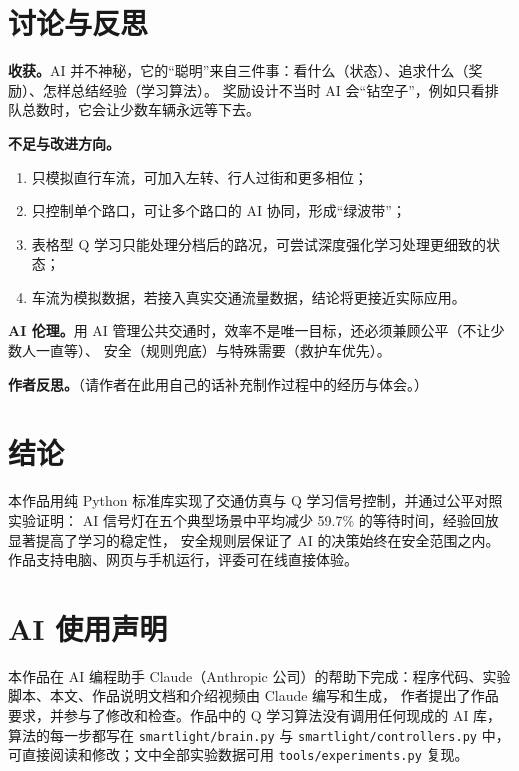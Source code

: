 \documentclass[UTF8,a4paper,zihao=-4,fontset=none]{ctexart}
\begin{document}
\section{讨论与反思}

\textbf{收获。}AI 并不神秘，它的“聪明”来自三件事：看什么（状态）、追求什么（奖励）、怎样总结经验（学习算法）。
奖励设计不当时 AI 会“钻空子”，例如只看排队总数时，它会让少数车辆永远等下去。

\textbf{不足与改进方向。}
\begin{enumerate}
  \item 只模拟直行车流，可加入左转、行人过街和更多相位；
  \item 只控制单个路口，可让多个路口的 AI 协同，形成“绿波带”；
  \item 表格型 Q 学习只能处理分档后的路况，可尝试深度强化学习\cite{mnih2015}处理更细致的状态；
  \item 车流为模拟数据，若接入真实交通流量数据，结论将更接近实际应用。
\end{enumerate}

\textbf{AI 伦理。}用 AI 管理公共交通时，效率不是唯一目标，还必须兼顾公平（不让少数人一直等）、
安全（规则兜底）与特殊需要（救护车优先）。

\textbf{作者反思。}（请作者在此用自己的话补充制作过程中的经历与体会。）

\section{结论}
本作品用纯 Python 标准库实现了交通仿真与 Q 学习信号控制，并通过公平对照实验证明：
AI 信号灯在五个典型场景中平均减少 59.7\% 的等待时间，经验回放显著提高了学习的稳定性，
安全规则层保证了 AI 的决策始终在安全范围之内。作品支持电脑、网页与手机运行，评委可在线直接体验。

\section*{AI 使用声明}
本作品在 AI 编程助手 Claude（Anthropic 公司）的帮助下完成：程序代码、实验脚本、本文、作品说明文档和介绍视频由 Claude 编写和生成，
作者提出了作品要求，并参与了修改和检查。作品中的 Q 学习算法没有调用任何现成的 AI 库，算法的每一步都写在
\texttt{smartlight/brain.py} 与 \texttt{smartlight/controllers.py} 中，可直接阅读和修改；文中全部实验数据可用 \texttt{tools/experiments.py} 复现。
\end{document}
